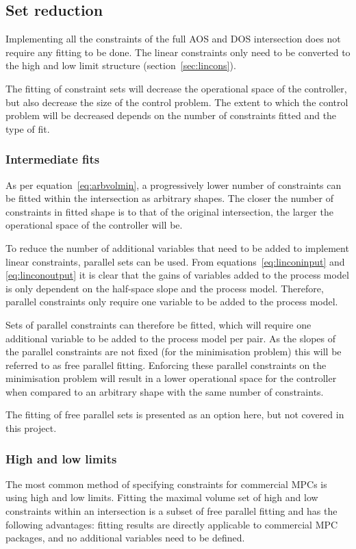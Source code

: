 \subsection{Set reduction}
Implementing all the constraints of the full AOS and DOS intersection does not require any fitting to be done.
The linear constraints only need to be converted to the high and low limit structure (section~\ref{sec:lincons}).

The fitting of constraint sets will decrease the operational space of the controller, but also decrease the size of the control problem.
The extent to which the control problem will be decreased depends on the number of constraints fitted and the type of fit.

\subsubsection{Intermediate fits}
As per equation~\ref{eq:arbvolmin}, a progressively lower number of constraints can be fitted within the intersection as arbitrary shapes.
The closer the number of constraints in fitted shape is to that of the original intersection, the larger the operational space of the controller will be.

To reduce the number of additional variables that need to be added to implement linear constraints, parallel sets can be used.
From equations~\ref{eq:linconinput} and \ref{eq:linconoutput} it is clear that the gains of variables added to the process model is only dependent on the half-space slope and the process model.
Therefore, parallel constraints only require one variable to be added to the process model.

Sets of parallel constraints can therefore be fitted, which will require one additional variable to be added to the process model per pair.
As the slopes of the parallel constraints are not fixed (for the minimisation problem) this will be referred to as free parallel fitting.
Enforcing these parallel constraints on the minimisation problem will result in a lower operational space for the controller when compared to an arbitrary shape with the same number of constraints.

The fitting of free parallel sets is presented as an option here, but not covered in this project.

\subsubsection{High and low limits}
The most common method of specifying constraints for commercial MPCs is using high and low limits.
Fitting the maximal volume set of high and low constraints within an intersection is a subset of free parallel fitting and has the following advantages: fitting results are directly applicable to commercial MPC packages, and no additional variables need to be defined.

